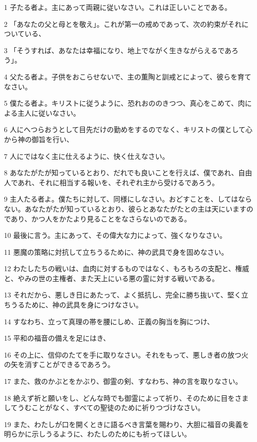 \par 1 子たる者よ。主にあって両親に従いなさい。これは正しいことである。
\par 2 「あなたの父と母とを敬え」。これが第一の戒めであって、次の約束がそれについている、
\par 3 「そうすれば、あなたは幸福になり、地上でながく生きながらえるであろう」。
\par 4 父たる者よ。子供をおこらせないで、主の薫陶と訓戒とによって、彼らを育てなさい。
\par 5 僕たる者よ。キリストに従うように、恐れおののきつつ、真心をこめて、肉による主人に従いなさい。
\par 6 人にへつらおうとして目先だけの勤めをするのでなく、キリストの僕として心から神の御旨を行い、
\par 7 人にではなく主に仕えるように、快く仕えなさい。
\par 8 あなたがたが知っているとおり、だれでも良いことを行えば、僕であれ、自由人であれ、それに相当する報いを、それぞれ主から受けるであろう。
\par 9 主人たる者よ。僕たちに対して、同様にしなさい。おどすことを、してはならない。あなたがたが知っているとおり、彼らとあなたがたとの主は天にいますのであり、かつ人をかたより見ることをなさらないのである。
\par 10 最後に言う。主にあって、その偉大な力によって、強くなりなさい。
\par 11 悪魔の策略に対抗して立ちうるために、神の武具で身を固めなさい。
\par 12 わたしたちの戦いは、血肉に対するものではなく、もろもろの支配と、権威と、やみの世の主権者、また天上にいる悪の霊に対する戦いである。
\par 13 それだから、悪しき日にあたって、よく抵抗し、完全に勝ち抜いて、堅く立ちうるために、神の武具を身につけなさい。
\par 14 すなわち、立って真理の帯を腰にしめ、正義の胸当を胸につけ、
\par 15 平和の福音の備えを足にはき、
\par 16 その上に、信仰のたてを手に取りなさい。それをもって、悪しき者の放つ火の矢を消すことができるであろう。
\par 17 また、救のかぶとをかぶり、御霊の剣、すなわち、神の言を取りなさい。
\par 18 絶えず祈と願いをし、どんな時でも御霊によって祈り、そのために目をさましてうむことがなく、すべての聖徒のために祈りつづけなさい。
\par 19 また、わたしが口を開くときに語るべき言葉を賜わり、大胆に福音の奥義を明らかに示しうるように、わたしのためにも祈ってほしい。
